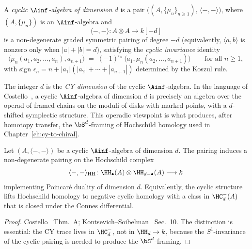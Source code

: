 \begin{definition}
\label{def:cyclic-ainf-d}
A \emph{cyclic $\Ainf$-algebra of dimension $d$} is a pair $\bigl((A, \{\mu_n\}_{n \geq 1}),\, \langle -, - \rangle\bigr)$, where $(A, \{\mu_n\})$ is an $\Ainf$-algebra and
\[
 \langle -, - \rangle \colon A \otimes A \longrightarrow k[-d]
\]
is a non-degenerate graded symmetric pairing of degree $-d$ (equivalently, $\langle a, b \rangle$ is nonzero only when $|a| + |b| = d$), satisfying the \emph{cyclic invariance} identity
\[
 \langle \mu_n(a_1, a_2, \ldots, a_n), a_{n+1} \rangle
 \;=\; (-1)^{\epsilon_n}\,
 \langle a_1, \mu_n(a_2, \ldots, a_{n+1}) \rangle
 \qquad \text{for all } n \geq 1,
\]
with sign $\epsilon_n = n + |a_1|(|a_2| + \cdots + |a_{n+1}|)$ determined by the Koszul rule.
\end{definition}

The integer $d$ is the \emph{CY dimension} of the cyclic $\Ainf$-algebra. In the language of Costello~\cite{Costello2005TCFT,Costello2007Ainfty}, a cyclic $\Ainf$-algebra of dimension $d$ is precisely an algebra over the operad of framed chains on the moduli of disks with marked points, with a $d$-shifted symplectic structure. This operadic viewpoint is what produces, after homotopy transfer, the $\bS^d$-framing of Hochschild homology used in Chapter~\ref{ch:cy-to-chiral}.

\begin{proposition}
\label{prop:cyclic-invariance-hochschild}
Let $(A, \langle -, - \rangle)$ be a cyclic $\Ainf$-algebra of dimension $d$. The pairing induces a non-degenerate pairing on the Hochschild complex
\[
 \langle -, - \rangle_{\mathrm{HH}} \colon \HH_\bullet(A) \otimes \HH_{d-\bullet}(A) \longrightarrow k
\]
implementing Poincar\'e duality of dimension $d$. Equivalently, the cyclic structure lifts Hochschild homology to negative cyclic homology with a class in $\HC^-_d(A)$ that is closed under the Connes differential.
\end{proposition}

\begin{proof}
Costello~\cite{Costello2007Ainfty} Thm.~A; Kontsevich--Soibelman~\cite{KontsevichSoibelman2009} Sec.~10. The distinction is essential: the CY trace lives in $\HC^-_d$, not in $\HH_d \to k$, because the $S^1$-invariance of the cyclic pairing is needed to produce the $\bS^d$-framing.
\end{proof}

